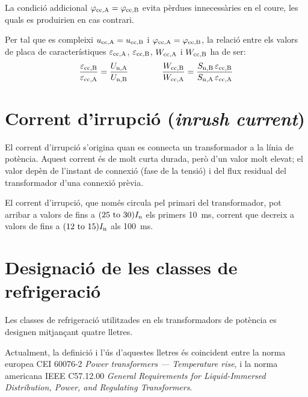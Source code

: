 La condició addicional $\varphi_\mathrm{cc,A} =\varphi_\mathrm{cc,B}$ evita pèrdues innecessàries en el coure, les quals es produirien en cas contrari.

Per tal que es compleixi $u_\mathrm{cc,A} = u_\mathrm{cc,B} $ i $\varphi_\mathrm{cc,A} =\varphi_\mathrm{cc,B}$, la relació entre els valors de placa de característiques $\varepsilon_\mathrm{cc,A}$, $\varepsilon_\mathrm{cc,B}$, $W_\mathrm{cc,A}$ i $W_\mathrm{cc,B}$ ha de ser:
\begin{equation}
    \frac{\varepsilon_\mathrm{cc,B}}{\varepsilon_\mathrm{cc,A}} = \frac{U_\mathrm{n,A}}{U_\mathrm{n,B}} \qquad\qquad
    \frac{W_\mathrm{cc,B}}{W_\mathrm{cc,A}} = \frac{S_\mathrm{n,B} \,\varepsilon_\mathrm{cc,B}}{S_\mathrm{n,A}\, \varepsilon_\mathrm{cc,A}}
\end{equation}

\section{Corrent d'irrupció (\textit{inrush current})}

El corrent d'irrupció s'origina quan es  connecta un transformador a la línia de potència. Aquest corrent és de molt curta durada, però d'un valor molt elevat; el valor depèn de l'instant de connexió (fase de la tensió) i del flux residual del transformador d'una connexió prèvia.

El corrent d'irrupció, que només circula pel primari del transformador, pot arribar a valors de fins a $(\numrange{25}{30}) I\ped{n}$ els primers \qty{10}{ms}, corrent que decreix a valors de fins  a $(\numrange{12}{15}) I\ped{n}$ als \qty{100}{ms}.

\section{Designació de les classes de refrigeració}\label{sec:trafos-pot-refrig}
 

Les classes de refrigeració utilitzades en els transformadors de
potència es designen mitjançant quatre lletres.

Actualment, la definició i l'ús d'aquestes lletres és coincident
entre la norma europea CEI 60076-2 \textit{Power transformers --- Temperature rise}, i la norma americana
IEEE C57.12.00  \textit{General Requirements for Liquid-Immersed Distribution, Power, and Regulating Transformers}.

